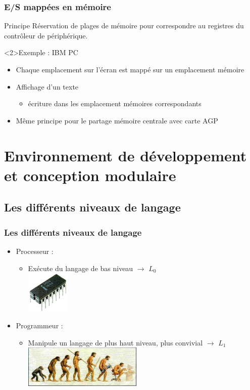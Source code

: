 \begin{frame}
\frametitle{E/S mappées en mémoire}
\begin{block}{Principe}
Réservation de plages de mémoire pour correspondre au registres du contrôleur de périphérique.
\end{block}

\begin{exampleblock}<2>{Exemple : IBM PC}
\begin{itemize}
\item Chaque emplacement sur l’écran est mappé sur un emplacement mémoire
\item Affichage d’un texte
\begin{itemize}
\item écriture dans les emplacement mémoires correspondants
\end{itemize}
\item Même principe pour le partage mémoire centrale avec carte AGP
\end{itemize}
\end{exampleblock}
\end{frame}


\section{Environnement de développement et conception modulaire}

\subsection{Les différents niveaux de langage}
\begin{frame}
\frametitle{Les différents niveaux de langage}
\begin{itemize}
\item Processeur :
\begin{itemize}
\item Exécute du langage de bas niveau $\rightarrow$ $L_0$ \\
\includegraphics[height=2cm]{../illustration/Intel4004.jpg}
\end{itemize}
\item Programmeur :
\begin{itemize}
\item Manipule un langage de plus haut niveau, plus convivial $\rightarrow$ $L_1$ \\
\includegraphics[height=2cm]{../illustration/evolution.jpg}
\end{itemize}
\end{itemize}
\end{frame}

